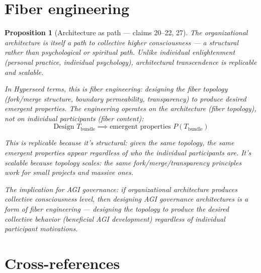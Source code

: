\documentclass[11pt,a4paper]{article}
\newtheorem{proposition}[definition]{Proposition}
\begin{document}

\section{Fiber engineering}
\label{sec:engineering}

\begin{proposition}[Architecture as path --- claims 20--22, 27]
\label{prop:engineering}
The organizational architecture is itself a path to collective higher
consciousness --- a structural rather than psychological or spiritual
path. Unlike individual enlightenment (personal practice, individual
psychology), architectural transcendence is replicable and scalable.

In Hyperseed terms, this is \emph{fiber engineering}: designing the
fiber topology (fork/merge structure, boundary permeability,
transparency) to produce desired emergent properties. The engineering
operates on the architecture (fiber topology), not on individual
participants (fiber content):
\[
  \text{Design } T_{\text{bundle}} \implies
  \text{emergent properties } P(T_{\text{bundle}})
\]

This is replicable because it's structural: given the same topology,
the same emergent properties appear regardless of who the individual
participants are. It's scalable because topology scales: the same
fork/merge/transparency principles work for small projects and massive
ones.

The implication for AGI governance: if organizational architecture
produces collective consciousness level, then designing AGI governance
architectures is a form of fiber engineering --- designing the topology
to produce the desired collective behavior (beneficial AGI development)
regardless of individual participant motivations.
\end{proposition}


\section{Cross-references}
\end{document}
